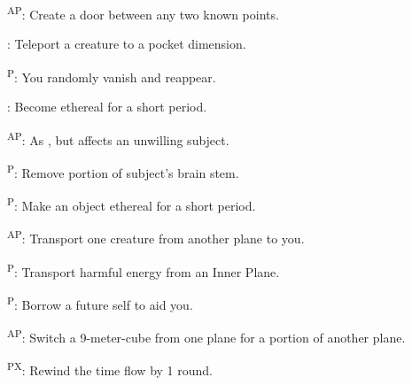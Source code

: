 \begin{enumerate*}
      \textsuperscript{AP}: Create a door between any two known points.

\item {}: Teleport a creature to a pocket dimension.

      \textsuperscript{P}: You randomly vanish and reappear.

      : Become ethereal for a short period.

      \textsuperscript{AP}: As , but affects an unwilling subject.

\item {}\textsuperscript{P}: Remove portion of subject's brain stem.

      \textsuperscript{P}: Make an object ethereal for a short period.

      \textsuperscript{AP}: Transport one creature from another plane to you.

\item {}\textsuperscript{P}: Transport harmful energy from an Inner Plane.

      \textsuperscript{P}: Borrow a future self to aid you.

\item {}\textsuperscript{AP}: Switch a 9-meter-cube from one plane for a portion of another plane.

      \textsuperscript{PX}: Rewind the time flow by 1 round.
\end{enumerate*}



